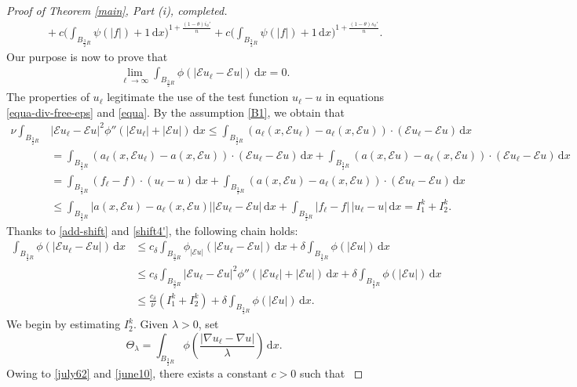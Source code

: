 \documentclass[leqno,11pt]{amsart}%
\numberwithin{equation}{section}
\def\d{\mathrm{d}}
\def\E{\mathcal{E}}
\def\dx{\d x}
\theoremstyle{definition}
\numberwithin{equation}{section}
\begin{document}
\begin{proof}[Proof of Theorem \ref{main}, Part (i), completed]
{\begin{align}
      &\quad+
   c
{\bigg(\int_{B_{\frac32 R}}\psi(|f|)+1\,\dx\bigg)^{1+\frac{({1-\theta}) i_\phi'}{n}}
+c\bigg(\int_{B_{\frac 32R}}\psi(|f|)+1\,\dx\bigg)^{1+\frac{({1-\theta}) s_\phi'}{n}}
       }.
  \end{align}}
Our purpose is now to prove that 
\begin{align}
    \label{july70}
\lim_{\ell\to \infty}\int_{B_{\frac32R}}\phi(|\E u_\ell-\E u|)\,\dx=0.
\end{align}
The properties of $u_\ell$ legitimate the  use of the test function $u_\ell-u$ in equations \eqref{equa-div-free-eps} and \eqref{equa}.  
By the assumption \eqref{B1}, we obtain that
\begin{align}\label{I1+I2}
	\nu\int_{B_{\frac{3}{2}R}}&|\E u_\ell-\E u|^2\phi''(|\E u_\ell|+|\E u |)\,\d x\le \int_{B_{\frac{3}{2}R}}( a_\ell(x,\E u_\ell)-a_\ell(x,\E u))\cdot (\E u_\ell-\E u)\, \d x \\
	 \nonumber &=\int_{B_{\frac{3}{2}R}}( a_\ell(x,\E u_\ell)-a(x,\E u)) \cdot (\E u_\ell-\E u)\, \d x+\int_{B_{\frac{3}{2}R}}( a(x,\E u)-a_\ell(x,\E u))\cdot (\E u_\ell-\E u)\, \d x\\
	 \nonumber &=\int_{B_{\frac{3}{2}R}} (f_\ell-f)\cdot ( u_\ell- u)\, \d x +\int_{B_{\frac{3}{2}R}} (a(x,\E u)-a_\ell(x,\E u))\cdot (\E u_\ell-\E u)\, \d x \\  
	&  \nonumber \le \int_{B_{\frac{3}{2}R}}| a(x,\E u)-a_\ell(x,\E u)|| \E u_\ell-\E u|\, \d x+\int_{B_{\frac{3}{2}R}} |f_\ell-f|\, | u_\ell- u|\, \d x = I_1^{k}+I_2^{k}.
	\end{align}
{ Thanks to \eqref{add-shift} and \eqref{shift4'}, the following chain holds:
\begin{align}
    \label{july75}
    \int_{B_{\frac{3}{2}R}}\phi (|\E u_\ell-\E u|)\, \d x & \leq  c_\delta \int_{B_{\frac{3}{2}R}}\phi_{|\E u|}(|\E u_\ell-\E u|)\, \d x + \delta \int_{B_{\frac{3}{2}R}}\phi (|\E u|)\, \d x 
    \\ \nonumber & \leq 
    c_\delta \int_{B_{\frac{3}{2}R}}|\E u_\ell-\E u|^2\phi''(|\E u_\ell|+|\E u |)\,\d x + \delta \int_{B_{\frac{3}{2}R}}\phi (|\E u|)\, \d x \\ \nonumber & \leq \frac {c_\delta}\nu (I_1^{k}+I_2^{k})+\delta \int_{B_{\frac{3}{2}R}}\phi (|\E u|)\, \d x.
\end{align}
We begin by estimating $I_2^{k}$.   Given $\lambda>0$,   set
$$\Theta_\lambda=\int_{B_{\frac{3}{2}R}} \phi\left(\frac{| \nabla u_\ell- \nabla u|}{\lambda}\right)\, \dx.$$
Owing to \eqref{july62} and \eqref{june10}, there exists a constant $c>0$ such that
}
\end{proof}
\end{document}
